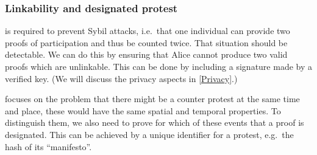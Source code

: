 \subsubsection{Linkability and designated protest}

 is required to prevent Sybil attacks, i.e.\ that one 
individual can provide two proofs of participation and thus be counted twice.
That situation should be detectable.
We can do this by ensuring that Alice cannot produce two valid proofs which
are unlinkable.
This can be done by including a signature made by a verified key.
(We will discuss the privacy aspects in \cref{Privacy}.)

 focuses on the problem that there might be a counter 
protest at the same time and place, these would have the same spatial and 
temporal properties.
To distinguish them, we also need to prove for which of these events that a 
proof is designated.
This can be achieved by a unique identifier for a protest, e.g.\ the hash of 
its \enquote{manifesto}.

